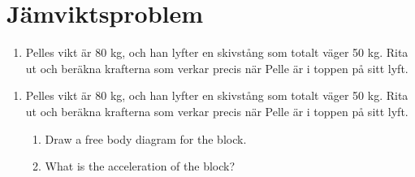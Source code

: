 \documentclass[12pt]{article}
\begin{document}
\section{Jämviktsproblem}

\begin{enumerate}
    \item Pelles vikt är 80 kg, och han lyfter en skivstång som totalt väger 50 kg. Rita ut och beräkna krafterna som verkar precis när Pelle är i toppen på sitt lyft.
    
    
    
\end{enumerate}

\begin{enumerate}
    \item Pelles vikt är 80 kg, och han lyfter en skivstång som totalt väger 50 kg. Rita ut och beräkna krafterna som verkar precis när Pelle är i toppen på sitt lyft.
          \begin{enumerate}
              \item Draw a free body diagram for the block.
              \item What is the acceleration of the block?
          \end{enumerate}
\end{enumerate}
\end{document}
